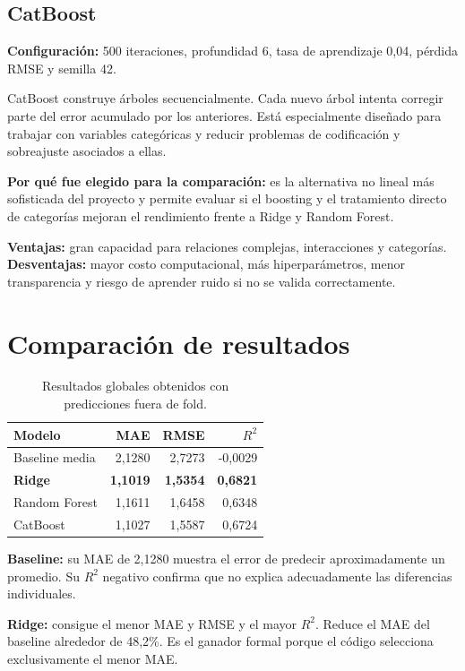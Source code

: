 \documentclass[11pt,a4paper]{article}
\begin{document}
\subsection{CatBoost}

\textbf{Configuración:} 500 iteraciones, profundidad 6, tasa de aprendizaje 0,04, pérdida RMSE y semilla 42.

CatBoost construye árboles secuencialmente. Cada nuevo árbol intenta corregir parte del error acumulado por los anteriores. Está especialmente diseñado para trabajar con variables categóricas y reducir problemas de codificación y sobreajuste asociados a ellas.

\textbf{Por qué fue elegido para la comparación:} es la alternativa no lineal más sofisticada del proyecto y permite evaluar si el boosting y el tratamiento directo de categorías mejoran el rendimiento frente a Ridge y Random Forest.

\textbf{Ventajas:} gran capacidad para relaciones complejas, interacciones y categorías. \textbf{Desventajas:} mayor costo computacional, más hiperparámetros, menor transparencia y riesgo de aprender ruido si no se valida correctamente.

\section{Comparación de resultados}

\begin{table}[H]
\centering
\caption{Resultados globales obtenidos con predicciones fuera de fold.}
\begin{tabular}{lrrr}
\toprule
\textbf{Modelo} & \textbf{MAE} & \textbf{RMSE} & \textbf{$R^2$}\\
\midrule
Baseline media & 2,1280 & 2,7273 & -0,0029\\
\textbf{Ridge} & \textbf{1,1019} & \textbf{1,5354} & \textbf{0,6821}\\
Random Forest & 1,1611 & 1,6458 & 0,6348\\
CatBoost & 1,1027 & 1,5587 & 0,6724\\
\bottomrule
\end{tabular}
\end{table}

\textbf{Baseline:} su MAE de 2,1280 muestra el error de predecir aproximadamente un promedio. Su $R^2$ negativo confirma que no explica adecuadamente las diferencias individuales.

\textbf{Ridge:} consigue el menor MAE y RMSE y el mayor $R^2$. Reduce el MAE del baseline alrededor de 48,2\%. Es el ganador formal porque el código selecciona exclusivamente el menor MAE.
\end{document}
